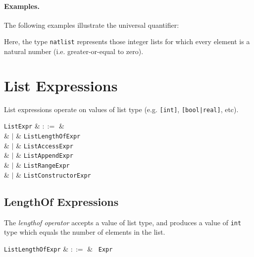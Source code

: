 \paragraph{Examples.}  The following examples illustrate the universal quantifier:



Here, the type \lstinline{natlist} represents those integer lists for which every element is a natural number (i.e. greater-or-equal to zero).


\section{List Expressions}
\label{c_expr_list}

List expressions operate on values of list type (e.g. \lstinline{[int]}, \lstinline{[bool|real]}, etc).

\begin{syntax}
  \verb+ListExpr+ & $::=$ &\\
  & $|$ & \verb+ListLengthOfExpr+\\
  & $|$ & \verb+ListAccessExpr+\\
  & $|$ & \verb+ListAppendExpr+\\
  & $|$ & \verb+ListRangeExpr+\\
  & $|$ & \verb+ListConstructorExpr+\\
\end{syntax}


\subsection{LengthOf Expressions}
\label{c_expr_lengthof}

The {\em lengthof operator} accepts a value of list type, and produces a value of \lstinline{int} type which equals the number of elements in the list.

\begin{syntax}
\verb+ListLengthOfExpr+ & $::=$ & \token{|}\ \verb+Expr+\ \token{|}\\
\end{syntax}

